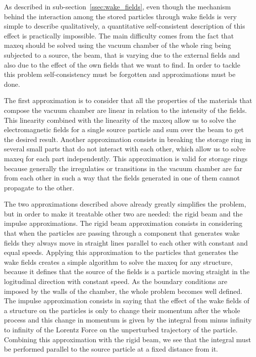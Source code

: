     As described in sub-section~\ref{ssec:wake_fields}, even though the mechanism behind the interaction among the stored particles through wake fields is very simple to describe qualitatively, a quantitative self-consistent description of this effect is practically impossible. The main difficulty comes from the fact that \gls{maxeq} should be solved using the vacuum chamber of the whole ring being subjected to a source, the beam, that is varying due to the external fields and also due to the effect of the own fields that we want to find. In order to tackle this problem self-consistency must be forgotten and approximations must be done.

    The first approximation is to consider that all the properties of the materials that compose the vacuum chamber are linear in relation to the intensity of the fields. This linearity combined with the linearity of the \gls{maxeq} allow us to solve the electromagnetic fields for a single source particle and sum over the beam to get the desired result. Another approximation consists in breaking the storage ring in several small parts that do not interact with each other, which allow us to solve \gls{maxeq} for each part independently. This approximation is valid for storage rings because generally the irregulaties or transitions in the vacuum chamber are far from each other in such a way that the fields generated in one of them cannot propagate to the other.

    The two approximations described above already greatly simplifies the problem, but in order to make it treatable other two are needed: the rigid beam and the impulse approximations. The rigid beam approximation consists in considering that when the particles are passing through a component that generates wake fields they always move in straight lines parallel to each other with constant and equal speeds. Applying this approximation to the particles that generates the wake fields creates a simple algorithm to solve the \gls{maxeq} for any structure, because it defines that the source of the fields is a particle moving straight in the logitudinal direction with constant speed. As the boundary conditions are imposed by the walls of the chamber, the whole problem becomes well defined. The impulse approximation consists in saying that the effect of the wake fields of a structure on the particles is only to change their momentum after the whole process and this change in momentum is given by the integral from minus infinity to infinity of the Lorentz Force on the unperturbed trajectory of the particle. Combining this approximation with the rigid beam, we see that the integral must be performed parallel to the source particle at a fixed distance from it.

